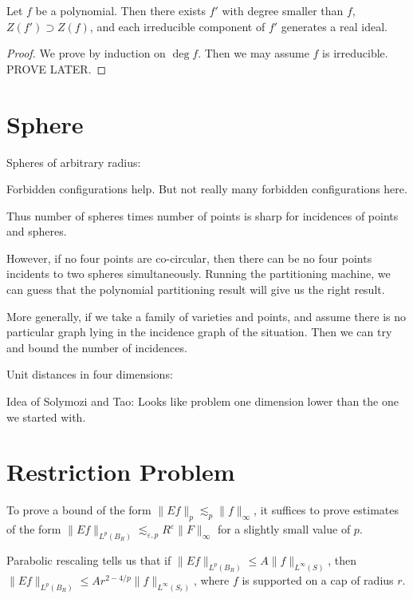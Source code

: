 \begin{lemma}
    Let $f$ be a polynomial. Then there exists $f'$ with degree smaller than $f$, $Z(f') \supset Z(f)$, and each irreducible component of $f'$ generates a real ideal.
\end{lemma}
\begin{proof}
    We prove by induction on $\deg f$. Then we may assume $f$ is irreducible. PROVE LATER.
\end{proof}


\chapter{Sphere}

Spheres of arbitrary radius:

Forbidden configurations help. But not really many forbidden configurations here.

Thus number of spheres times number of points is sharp for incidences of points and spheres.

However, if no four points are co-circular, then there can be no four points incidents to two spheres simultaneously. Running the partitioning machine, we can guess that the polynomial partitioning result will give us the right result.

More generally, if we take a family of varieties and points, and assume there is no particular graph lying in the incidence graph of the situation. Then we can try and bound the number of incidences.

Unit distances in four dimensions:

Idea of Solymozi and Tao: Looks like problem one dimension lower than the one we started with.

\chapter{Restriction Problem}

To prove a bound of the form $\| Ef \|_p \lesssim_p \| f \|_\infty$, it suffices to prove estimates of the form $\| Ef \|_{L^p(B_R)} \lesssim_{\varepsilon,p} R^\varepsilon \| F \|_\infty$ for a slightly small value of $p$.

Parabolic rescaling tells us that if $\| Ef \|_{L^p(B_R)} \leq A \| f \|_{L^\infty(S)}$, then $\| Ef \|_{L^p(B_R)} \leq A r^{2 - 4/p} \| f \|_{L^\infty(S_r)}$, where $f$ is supported on a cap of radius $r$.

